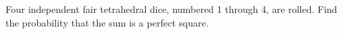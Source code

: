 Four independent fair tetrahedral dice, numbered 1 through 4, are rolled. Find the probability that the sum is a perfect square.
